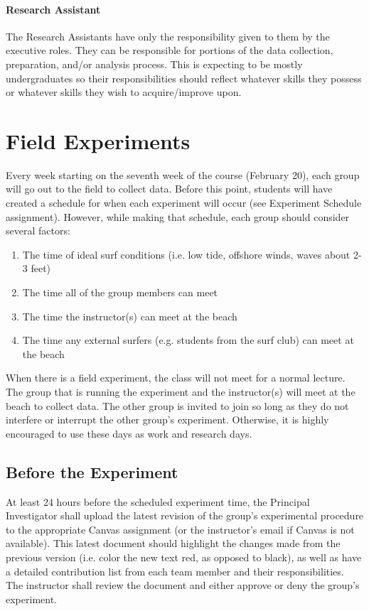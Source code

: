 \documentclass[
	letterpaper, %
	fontsize=10pt, %
	twoside=true, %
	numbers=noenddot, %
]{kaobook}
\begin{document}
\paragraph*{Research Assistant} The Research Assistants have only the responsibility given to them by the executive roles.
They can be responsible for portions of the data collection, preparation, and/or analysis process.
This is expecting to be mostly undergraduates so their responsibilities should reflect whatever skills they possess or whatever skills they wish to acquire/improve upon.

\section*{Field Experiments} 
Every week starting on the seventh week of the course (February 20), each group will go out to the field to collect data.
Before this point, students will have created a schedule for when each experiment will occur (see Experiment Schedule assignment).
However, while making that schedule, each group should consider several factors:

\begin{enumerate}
    \item The time of ideal surf conditions (i.e. low tide, offshore winds, waves about 2-3 feet)
    \item The time all of the group members can meet
    \item The time the instructor(s) can meet at the beach
    \item The time any external surfers (e.g. students from the surf club) can meet at the beach 
\end{enumerate}

When there is a field experiment, the class will not meet for a normal lecture.
The group that is running the experiment and the instructor(s) will meet at the beach to collect data.
The other group is invited to join so long as they do not interfere or interrupt the other group's experiment.
Otherwise, it is highly encouraged to use these days as work and research days.

\subsection*{Before the Experiment}
At least 24 hours before the scheduled experiment time, the Principal Investigator shall upload the latest revision of the group's experimental procedure to the appropriate Canvas assignment (or the instructor's email if Canvas is not available).
This latest document should highlight the changes made from the previous version (i.e. color the new text red, as opposed to black), as well as have a detailed contribution list from each team member and their responsibilities.
The instructor shall review the document and either approve or deny the group's experiment.
\end{document}
